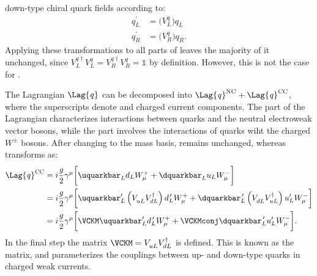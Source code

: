 down-type chiral quark fields according to:
\begin{align}
  q_L^\prime &= \big(V_L^q\big)q_{L}^{} \nonumber\\
  q_R^\prime &= \big(V_R^q\big)q_{R}^{}.
\end{align}
Applying these transformations to all parts of  leaves the majority of it unchanged, since
$V_{L}^{q\dagger} V_{L}^{q} = V_{R}^{q\dagger} V_{R}^{q} = \mathds{1}$ by definition.
However, this is not the case for .

The Lagrangian $\Lag{\it q}$ can be decomposed into
$\Lag{\it q}^\mathrm{NC}+\Lag{\it q}^\mathrm{CC}$, where the
superscripts denote \NC and charged current \CC components.
The \NC part of the Lagrangian characterizes interactions between quarks and the neutral electroweak
vector bosons, while the \CC part involves the interactions of quarks wiht the charged $W^\pm$
bosons.
After changing to the mass basis,  remains unchanged, whereas 
transforms as:
\begin{align}
  \Lag{\it q}^\mathrm{CC}
  &= i\frac{g}{2}\gamma^\mu
  \bigg[\uquarkbar_Ld_LW^+_\mu + \dquarkbar_Lu_LW^-_\mu
  \bigg]  \nonumber\\
  &= i\frac{g}{2}\gamma^\mu
  \bigg[
    \uquarkbar_L^\prime\left(V_{uL}^{\phantom{\dagger}}V_{dL}^\dagger\right)d_L^{\,\prime} W^+_\mu +
    \dquarkbar_L^{\,\prime}\left(V_{dL}^{\phantom{\dagger}}V_{uL}^\dagger\right)u_L^\prime W^-_\mu
  \bigg]  \nonumber\\
  &= i\frac{g}{2}\gamma^\mu
  \bigg[
    \VCKM\uquarkbar_L^\prime d_L^{\,\prime} W^+_\mu +
    \VCKMconj\dquarkbar_L^{\,\prime} u_L^\prime W^-_\mu
  \bigg].
\end{align}
In the final step the matrix
$\VCKM=V^{\phantom{\dagger}}_{uL}V_{dL}^\dagger$ is defined.
This is known as the \ckm
matrix, and parameterizes the couplings between up- and down-type quarks in charged weak currents.



